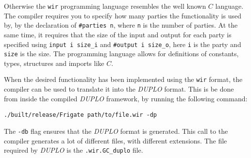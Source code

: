\documentclass[twoside,11pt,openright]{report}
\newcommand{\DUPLO}{\textit{DUPLO} }
\begin{document}
Otherwise the \verb|wir| programming language resembles the well known $C$ language. The compiler requires you to specify how many parties the functionality is used by, by the declaration of \verb|#parties n|, where \verb|n| is the number of parties. At the same time, it requires that the size of the input and output for each party is specified using \verb|input i size_i| and \verb|#output i size_o|, here \verb|i| is the party and \verb|size| is the size. The programming language allows for definitions of constants, types, structures and imports like $C$.

\bigskip

When the desired functionality has been implemented using the \verb|wir| format, the compiler can be used to translate it into the \DUPLO format. This is be done from inside the compiled \DUPLO framework, by running the following command:

\begin{center}
\begin{verbatim}
./built/release/Frigate path/to/file.wir -dp
\end{verbatim}
\end{center}

The \verb|-db| flag ensures that the \DUPLO format is generated. This call to the compiler generates a lot of different files, with different extensions. The file required by \DUPLO is the \verb|.wir.GC_duplo| file.

\bigskip
\end{document}
